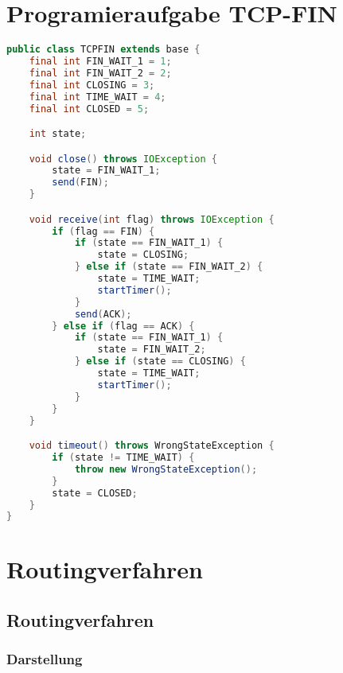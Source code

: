 \documentclass{article}
\begin{document}
		\section{Programieraufgabe TCP-FIN}
			\begin{lstlisting}[language=java]
public class TCPFIN extends base {
	final int FIN_WAIT_1 = 1;
	final int FIN_WAIT_2 = 2;
	final int CLOSING = 3;
	final int TIME_WAIT = 4;
	final int CLOSED = 5;

	int state;

	void close() throws IOException {
		state = FIN_WAIT_1;
		send(FIN);
	}

	void receive(int flag) throws IOException {
		if (flag == FIN) {
			if (state == FIN_WAIT_1) {
				state = CLOSING;
			} else if (state == FIN_WAIT_2) {
				state = TIME_WAIT;
				startTimer();
			}
			send(ACK);
		} else if (flag == ACK) {
			if (state == FIN_WAIT_1) {
				state = FIN_WAIT_2;
			} else if (state == CLOSING) {
				state = TIME_WAIT;
				startTimer();
			}
		}
	}

	void timeout() throws WrongStateException {
		if (state != TIME_WAIT) {
			throw new WrongStateException();
		}
		state = CLOSED;
	}
}
\end{lstlisting}
\newpage
	\section{Routingverfahren}
		\subsection{Routingverfahren}
			\subsubsection{Darstellung}
\end{document}
